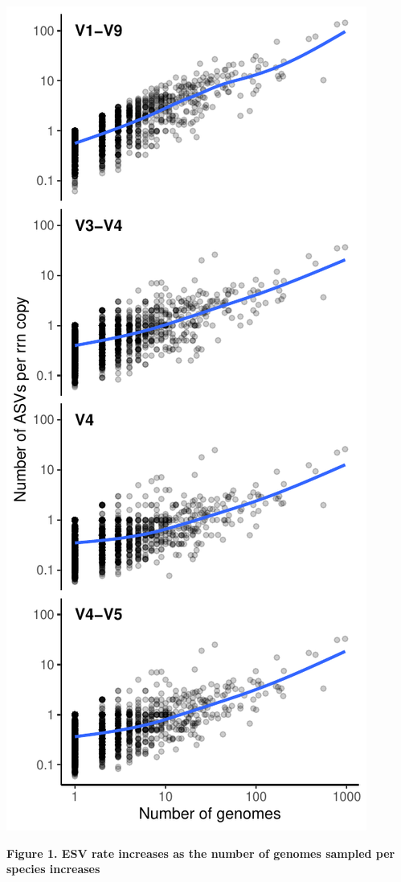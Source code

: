 \documentclass[
]{article}
\begin{document}
\newpage

\includegraphics{../figures/esv_rate.pdf}

\textbf{Figure 1. ESV rate increases as the number of genomes sampled
per species increases}
\end{document}
